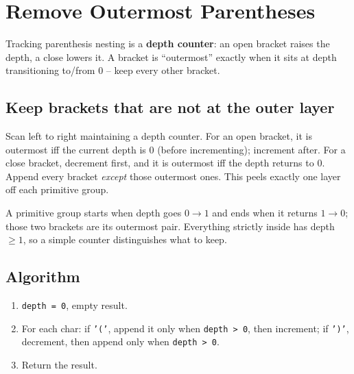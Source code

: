 \section{Remove Outermost Parentheses}
\label{sec:str-remove-outer-parens}


\begin{patternbox}
Tracking parenthesis nesting is a \textbf{depth counter}: an open bracket
raises the depth, a close lowers it. A bracket is ``outermost'' exactly when
it sits at depth transitioning to/from $0$ -- keep every other bracket.
\end{patternbox}

\subsection*{Keep brackets that are not at the outer layer}

Scan left to right maintaining a depth counter. For an open bracket, it is
outermost iff the current depth is $0$ (before incrementing); increment
after. For a close bracket, decrement first, and it is outermost iff the
depth returns to $0$. Append every bracket \emph{except} those outermost
ones. This peels exactly one layer off each primitive group.

\begin{ideabox}
A primitive group starts when depth goes $0\to1$ and ends when it returns
$1\to0$; those two brackets are its outermost pair. Everything strictly
inside has depth $\ge1$, so a simple counter distinguishes what to keep.
\end{ideabox}

\subsection*{Algorithm}

\begin{enumerate}
  \item \texttt{depth = 0}, empty result.
  \item For each char: if \texttt{'('}, append it only when \texttt{depth
        > 0}, then increment; if \texttt{')'}, decrement, then append only
        when \texttt{depth > 0}.
  \item Return the result.
\end{enumerate}

